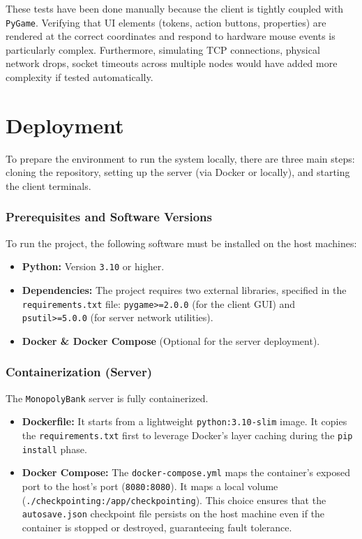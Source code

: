 \documentclass{scrartcl}
\begin{document}
These tests have been done manually because the client is tightly coupled with \texttt{PyGame}.
Verifying that UI elements (tokens, action buttons, properties) are rendered at the correct coordinates
and respond to hardware mouse events is particularly complex.
Furthermore, simulating TCP connections, physical network drops, socket timeouts across multiple nodes would have added
more complexity if tested automatically.

\section{Deployment}\label{deployment}

To prepare the environment to run the system locally,
there are three main steps: cloning the repository, setting up the server (via Docker or locally), and starting the client terminals.

\subsubsection*{Prerequisites and Software Versions}
To run the project, the following software must be installed on the host machines:
\begin{itemize}
    \item \textbf{Python:} Version \texttt{3.10} or higher.
    \item \textbf{Dependencies:} The project requires two external libraries,
    specified in the \texttt{requirements.txt} file: \texttt{pygame>=2.0.0} (for the client GUI)
    and \texttt{psutil>=5.0.0} (for server network utilities).
    \item \textbf{Docker \& Docker Compose} (Optional for the server deployment).
\end{itemize}

\subsubsection*{Containerization (Server)}
The \texttt{MonopolyBank} server is fully containerized.
\begin{itemize}
    \item \textbf{Dockerfile:} It starts from a lightweight \texttt{python:3.10-slim} image.
    It copies the \texttt{requirements.txt} first to leverage Docker's layer caching during the \texttt{pip install} phase.
    \item \textbf{Docker Compose:} The \texttt{docker-compose.yml} maps the container's exposed port to the host's port (\texttt{8080:8080}).
    It maps a local volume (\texttt{./checkpointing:/app/checkpointing}).
    This choice ensures that the \texttt{autosave.json} checkpoint file persists on the host machine even if the container
    is stopped or destroyed, guaranteeing fault tolerance.
\end{itemize}
\end{document}
